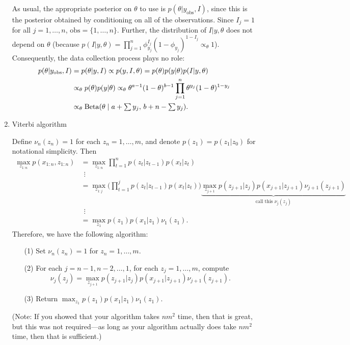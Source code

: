 \documentclass[12pt]{article}
\begin{document}
\begin{enumerate}
As usual, the appropriate posterior on $\theta$ to use is $p(\theta | y_\text{obs},I)$, since this is the posterior obtained by conditioning on all of the observations.  Since $I_j = 1$ for all $j = 1,\ldots,n$, $\mathrm{obs}= \{1,\ldots,n \}$.  Further, the distribution of $I| y,\theta$ does not depend on $\theta$ (because $p(I | y,\theta) = \prod_{j = 1}^n \phi_{y_j}^{I_j}(1 - \phi_{y_j})^{1 - I_j} \propto_\theta 1$). Consequently, the data collection process plays no role:
\begin{align*}
p(\theta | y_\text{obs},I) &= p(\theta | y,I) \propto p(y,I,\theta) = p(\theta) p(y | \theta) p(I | y,\theta)\\
& \propto_\theta p(\theta) p(y | \theta) \propto_\theta \theta^{a -1}(1 - \theta)^{b -1} \prod_{j = 1}^n \theta^{y_j}(1 - \theta)^{1 - y_j}\\
& \propto_\theta \operatorname*{Beta}(\theta \mid a + \textstyle\sum y_j,\, b + n - \sum y_j).
\end{align*}

\item Viterbi algorithm

Define $\nu_n(z_n) = 1$ for each $z_n = 1,\ldots,m$, and denote $p(z_1) = p(z_1 | z_0)$ for notational simplicity. Then
\begin{align*}
\max_{z_{1:n}} p(x_{1:n},z_{1:n}) & = \max_{z_{1:n}} \prod_{t = 1}^n p(z_t | z_{t -1}) p(x_t | z_t)\\
&~~\vdots\\
& = \max_{z_{1:j}} \Big(\prod_{t=1}^{j} p(z_t | z_{t -1}) p(x_t | z_t) \Big) \underbrace{\max_{z_{j +1}} p(z_{j +1} | z_j) p(x_{j +1} | z_{j +1}) \nu_{j +1}(z_{j +1})}_{\textstyle\text{call this } \nu_j(z_j)}\\
& ~~\vdots\\
& = \max_{z_1} p(z_1) p(x_1 | z_1) \nu_1(z_1).
\end{align*}
Therefore, we have the following algorithm:
\begin{enumerate}
\item[(1)] Set $\nu_n(z_n) = 1$ for $z_n = 1,\ldots,m$.
\item[(2)] For each $j = n -1,n -2,\ldots,1$, for each $z_j = 1,\ldots,m$, compute
$$ \nu_j(z_j) = \max_{z_{j +1}} p(z_{j +1} | z_j) p(x_{j +1} | z_{j +1}) \nu_{j +1}(z_{j +1}). $$
\item[(3)] Return $\max_{z_1} p(z_1) p(x_1 | z_1) \nu_1(z_1)$.
\end{enumerate}
(Note: If you showed that your algorithm takes $n m^2$ time, then that is great, but this was not required---as long as your algorithm actually does take $n m^2$ time, then that is sufficient.)
\end{enumerate}
\end{document}
